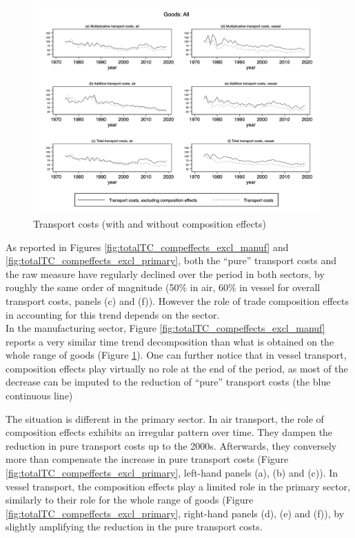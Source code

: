 \documentclass[11pt,twoside, authoryear]{elsarticle}
\begin{document}
\begin{figure}[htbp]
\caption{Transport costs (with and without composition effects)}
\label{fig:totalTC_compeffects_excl}
\begin{center}
\includegraphics[height=8cm]
{../graph_composition_all.jpg}
\end{center}
\end{figure}

As reported in Figures \ref{fig:totalTC_compeffects_excl_manuf} and \ref{fig:totalTC_compeffects_excl_primary}, both the ``pure'' transport costs and the raw measure have regularly declined over the period in both sectors, by roughly the same order of magnitude (50\% in air, 60\% in vessel for overall transport costs, panels (c) and (f)). However the role of trade composition effects in accounting for this trend depends on the sector.\\
In the manufacturing sector, Figure \ref{fig:totalTC_compeffects_excl_manuf} reports a very similar time trend decomposition than what is obtained on the whole range of goods (Figure \ref{fig:totalTC_compeffects_excl}).  One can further notice that in vessel transport, composition effects play virtually no role at the end of the period, as most of the decrease can be imputed to the reduction of ``pure'' transport costs (the blue continuous line)


The situation is different in the primary sector. In air transport, the role of composition effects exhibits an irregular pattern over time. They dampen the reduction in pure transport costs up to the 2000s. Afterwards, they conversely more than compensate the increase in pure transport costs (Figure \ref{fig:totalTC_compeffects_excl_primary}, left-hand panels (a), (b) and (c)). In vessel transport, the composition effects play a limited role in the primary sector, similarly to their role for the whole range of goods (Figure \ref{fig:totalTC_compeffects_excl_primary}, right-hand panels (d), (e) and (f)), by slightly amplifying the reduction in the pure transport costs.
\end{document}
